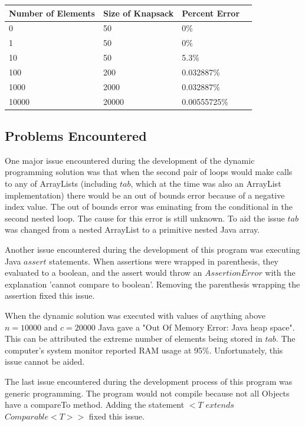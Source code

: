 \documentclass[onecolumn, 12pt, article]{IEEEtran}
\numberwithin{case}{problem}
\numberwithin{condition}{problem}
\numberwithin{condition}{subsection}
\numberwithin{definition}{section}
\theoremstyle{remark}
\numberwithin{question}{problem}
\theoremstyle{plain}
\numberwithin{answer}{problem}
\numberwithin{solution}{section}
\numberwithin{equation}{section}%
\begin{document}
\begin{center}
\begin{tabular}{|l|l|l|l}
\hline Number of Elements & Size of Knapsack & Percent Error \\
\hline 0 & 50 & 0\% \\
\hline 1 & 50 & 0\% \\
\hline 10 & 50 & 5.3\% \\
\hline 100 & 200 & 0.032887\% \\
\hline 1000 & 2000 & 0.032887\% \\
\hline 10000 & 20000 & 0.00555725\% \\
\hline
\end{tabular}
\end{center}

\subsection{Problems Encountered}
One major issue encountered during the development of the dynamic programming solution was that when the second pair of loops would make calls to any of ArrayLists (including $tab$, which at the time was also an ArrayList implementation) there would be an out of bounds error because of a negative index value. The out of bounds error was eminating from the conditional in the second nested loop. The cause for this error is still unknown. To aid the issue $tab$ was changed from a nested ArrayList to a primitive nested Java array. 

Another issue encountered during the development of this program was executing Java $assert$ statements. When assertions were wrapped in parenthesis, they evaluated to a boolean, and the assert would throw an $AssertionError$ with the explanation 'cannot compare to boolean'. Removing the parenthesis wrapping the assertion fixed this issue.

When the dynamic solution was executed with values of anything above $n = 10000$ and $c = 20000$ Java gave a "Out Of Memory Error: Java heap space". This can be attributed the extreme number of elements being stored in $tab$. The computer's system monitor reported RAM usage at 95\%. Unfortunately, this issue cannot be aided. 

The last issue encountered during the development process of this program was generic programming. The program would not compile because not all Objects have a compareTo method. Adding the statement $<T$ $extends$ $Comparable<T>>$ fixed this issue. \cite{erik}
\end{document}
